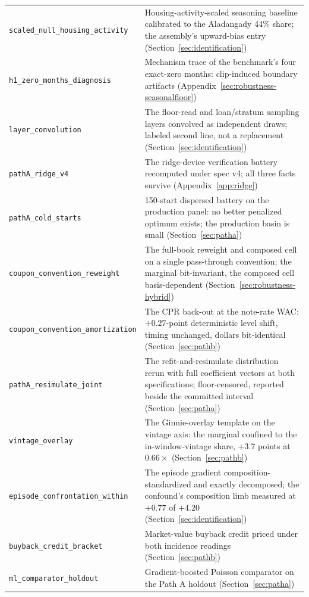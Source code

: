 \documentclass[12pt]{article}
\begin{document}
\begin{table}[H]
\begin{threeparttable}
\begin{tabular}{@{}p{5.4cm}p{8.8cm}@{}}
\texttt{scaled\_null\_housing\_activity} & Housing-activity-scaled seasoning baseline calibrated to the Aladangady 44\% share; the assembly's upward-bias entry (Section~\ref{sec:identification}) \\
\texttt{h1\_zero\_months\_diagnosis} & Mechanism trace of the benchmark's four exact-zero months: clip-induced boundary artifacts (Appendix~\ref{sec:robustness-seasonalfloor}) \\
\texttt{layer\_convolution} & The floor-read and loan/stratum sampling layers convolved as independent draws; labeled second line, not a replacement (Section~\ref{sec:identification}) \\
\texttt{pathA\_ridge\_v4} & The ridge-device verification battery recomputed under spec v4; all three facts survive (Appendix~\ref{app:ridge}) \\
\texttt{pathA\_cold\_starts} & 150-start dispersed battery on the production panel: no better penalized optimum exists; the production basin is small (Section~\ref{sec:patha}) \\
\texttt{coupon\_convention\_reweight} & The full-book reweight and composed cell on a single pass-through convention; the marginal bit-invariant, the composed cell basis-dependent (Section~\ref{sec:robustness-hybrid}) \\
\texttt{coupon\_convention\_amortization} & The CPR back-out at the note-rate WAC: $+0.27$-point deterministic level shift, timing unchanged, dollars bit-identical (Section~\ref{sec:pathb}) \\
\texttt{pathA\_resimulate\_joint} & The refit-and-resimulate distribution rerun with full coefficient vectors at both specifications; floor-censored, reported beside the committed interval (Section~\ref{sec:patha}) \\
\texttt{vintage\_overlay} & The Ginnie-overlay template on the vintage axis: the marginal confined to the in-window-vintage share, $+3.7$ points at $0.66\times$ (Section~\ref{sec:pathb}) \\
\texttt{episode\_confrontation\_within} & The episode gradient composition-standardized and exactly decomposed; the confound's composition limb measured at $+0.77$ of $+4.20$ (Section~\ref{sec:identification}) \\
\texttt{buyback\_credit\_bracket} & Market-value buyback credit priced under both incidence readings (Section~\ref{sec:pathb}) \\
\texttt{ml\_comparator\_holdout} & Gradient-boosted Poisson comparator on the Path A holdout (Section~\ref{sec:patha}) \\

\end{tabular}
\end{threeparttable}
\end{table}
\end{document}
